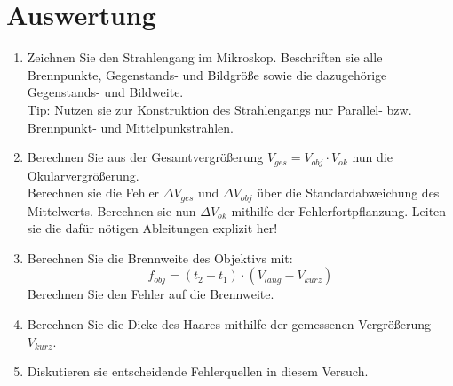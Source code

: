 \section{Auswertung} 

\begin{enumerate}
%
\item Zeichnen Sie den Strahlengang im Mikroskop. Beschriften sie alle Brennpunkte, Gegenstands- und Bildgröße sowie die dazugehörige Gegenstands- und Bildweite.\\
Tip: Nutzen sie zur Konstruktion des Strahlengangs nur Parallel- bzw. Brennpunkt- und Mittelpunkstrahlen.
%
\item Berechnen Sie aus der Gesamtvergrößerung $V_{ges} = V_{obj}\cdot V_{ok}$ nun die Okularvergrößerung.\\
Berechnen sie die Fehler $\Delta V_{ges}$ und $\Delta V_{obj}$ über die Standardabweichung des Mittelwerts. Berechnen sie nun $\Delta V_{ok}$ mithilfe der Fehlerfortpflanzung. Leiten sie die dafür nötigen Ableitungen explizit her!
%
\item Berechnen Sie die Brennweite des Objektivs mit:
\begin{equation*}
f_{obj} = \left(t_2-t_1\right)\cdot\left(V_{lang}- V_{kurz}\right)
\end{equation*}
Berechnen Sie den Fehler auf die Brennweite.
%
\item Berechnen Sie die Dicke des Haares mithilfe der gemessenen Vergrößerung $V_{kurz}$.
%
\item Diskutieren sie entscheidende Fehlerquellen in diesem Versuch.
%
\end{enumerate}